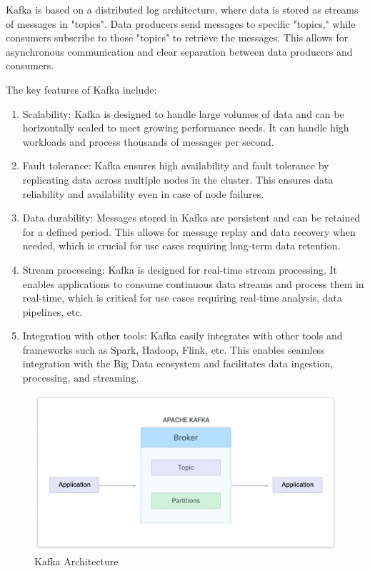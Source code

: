 Kafka is based on a distributed log architecture, where data is stored as streams of messages in "topics". Data producers send messages to specific "topics," while consumers subscribe to those "topics" to retrieve the messages. This allows for asynchronous communication and clear separation between data producers and consumers.

\cite{kafka}

The key features of Kafka include:

\begin{enumerate}
\item Scalability: Kafka is designed to handle large volumes of data and can be horizontally scaled to meet growing performance needs. It can handle high workloads and process thousands of messages per second.
\item Fault tolerance: Kafka ensures high availability and fault tolerance by replicating data across multiple nodes in the cluster. This ensures data reliability and availability even in case of node failures.
\item Data durability: Messages stored in Kafka are persistent and can be retained for a defined period. This allows for message replay and data recovery when needed, which is crucial for use cases requiring long-term data retention.
\item Stream processing: Kafka is designed for real-time stream processing. It enables applications to consume continuous data streams and process them in real-time, which is critical for use cases requiring real-time analysis, data pipelines, etc.
\item Integration with other tools: Kafka easily integrates with other tools and frameworks such as Spark, Hadoop, Flink, etc. This enables seamless integration with the Big Data ecosystem and facilitates data ingestion, processing, and streaming.
\end{enumerate}

\begin{figure}[H]
\centering
\includegraphics[width=\linewidth]{images/kafka.jpg}
\caption{Kafka Architecture}\label{fig:kafka}
\end{figure}

